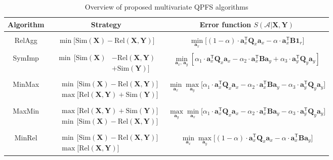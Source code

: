 \documentclass[12pt,twoside]{article}
\theoremstyle{definition}
\newcommand{\ba}{\mathbf{a}}
\newcommand{\bY}{\mathbf{Y}}
\newcommand{\bX}{\mathbf{X}}
\newcommand{\bB}{\mathbf{B}}
\newcommand{\bQ}{\mathbf{Q}}
\newcommand{\cA}{\mathcal{A}}
\newcommand{\T}{\mathsf{T}}
\newcommand{\bOne}{\boldsymbol{1}}
\begin{document}
\begin{table}
	\centering
	\begin{tabular}{c|c|c}
		\hline
		Algorithm & Strategy & Error function $S(\cA | \bX, \bY)$ \\
		\hline && \\ [-.5em]
		RelAgg & $\min \bigl[ \text{Sim}(\bX) - \text{Rel}(\bX, \bY) \bigr] $ & $\min\limits_{\ba_x} \bigl[ (1 - \alpha) \cdot \ba_x^{\T} \bQ_x \ba_x - \alpha \cdot \ba_x^{\T} \bB \bOne_r \bigr] $ \\ &&\\[-.5em]
		SymImp & $\begin{aligned} \min \, \bigl[ \text{Sim}(\bX) & - \text{Rel}(\bX, \bY) \\ & + \text{Sim}(\bY) \bigr] \end{aligned}$ & $ \min\limits_{\ba_x, \, \ba_y} \left[ \alpha_1 \cdot \ba_x^{\T} \bQ_x \ba_x - \alpha_2 \cdot \ba_x^{\T} \bB \ba_y + \alpha_3 \cdot \ba_y^{\T} \bQ_y \ba_y \right] $\\ &&\\ [-.5em]
		MinMax & $\begin{aligned} &\min \, \bigl[ \text{Sim}(\bX) - \text{Rel}(\bX, \bY) \bigr]  \\ & \max \bigl[\text{Rel}(\bX, \bY) + \text{Sim}(\bY) \bigr] \end{aligned}$ & $	\min\limits_{\ba_x} 	\max\limits_{\ba_y} \bigl[\alpha_1 \cdot \ba_x^{\T} \bQ_x \ba_x - \alpha_2 \cdot \ba_x^{\T} \bB \ba_y - \alpha_3 \cdot \ba_y^{\T} \bQ_y \ba_y \bigr]$ \\ &&\\ 
		MaxMin & $\begin{aligned} &\max \bigl[\text{Rel}(\bX, \bY) + \text{Sim}(\bY) \bigr] \\ & \min \, \bigl[ \text{Sim}(\bX) - \text{Rel}(\bX, \bY) \bigr]  \end{aligned}$ & $\max\limits_{\ba_y} \min\limits_{\ba_x} \bigl[\alpha_1 \cdot \ba_x^{\T} \bQ_x \ba_x - \alpha_2 \cdot \ba_x^{\T} \bB \ba_y - \alpha_3 \cdot \ba_y^{\T} \bQ_y \ba_y \bigr]$\\ &&\\ [-.5em]
		MinRel & $\begin{aligned} &\min \, \bigl[ \text{Sim}(\bX) - \text{Rel}(\bX, \bY) \bigr]  \\ & \max \bigl[\text{Rel}(\bX, \bY) \bigr] \end{aligned}$& $\min\limits_{\ba_x} 	\max\limits_{\ba_y} \bigl[ (1 - \alpha) \cdot \ba_x^{\T} \bQ_x \ba_x - \alpha \cdot \ba_x^{\T} \bB \ba_y \bigr]$ \\ 
		\hline
	\end{tabular}
	\caption{Overview of proposed multivariate QPFS algorithms}
	\label{tbl:summary}
\end{table}
\end{document}
